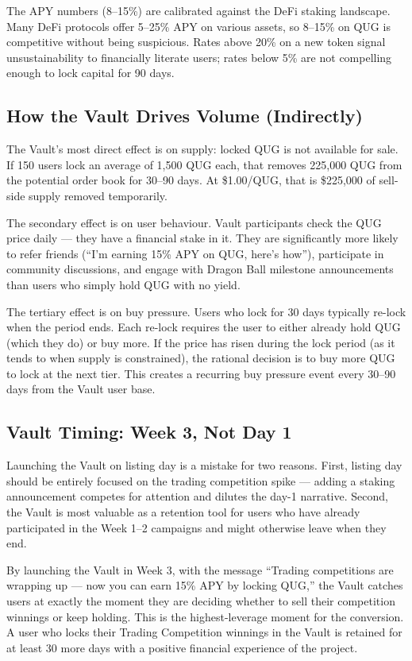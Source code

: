\documentclass[11pt,a4paper]{article}
\begin{document}
The APY numbers (8--15\%) are calibrated against the DeFi staking landscape. Many DeFi protocols offer 5--25\% APY on various assets, so 8--15\% on QUG is competitive without being suspicious. Rates above 20\% on a new token signal unsustainability to financially literate users; rates below 5\% are not compelling enough to lock capital for 90 days.

\subsection{How the Vault Drives Volume (Indirectly)}

The Vault's most direct effect is on supply: locked QUG is not available for sale. If 150 users lock an average of 1,500 QUG each, that removes 225,000 QUG from the potential order book for 30--90 days. At \$1.00/QUG, that is \$225,000 of sell-side supply removed temporarily.

The secondary effect is on user behaviour. Vault participants check the QUG price daily — they have a financial stake in it. They are significantly more likely to refer friends (``I'm earning 15\% APY on QUG, here's how''), participate in community discussions, and engage with Dragon Ball milestone announcements than users who simply hold QUG with no yield.

The tertiary effect is on buy pressure. Users who lock for 30 days typically re-lock when the period ends. Each re-lock requires the user to either already hold QUG (which they do) or buy more. If the price has risen during the lock period (as it tends to when supply is constrained), the rational decision is to buy more QUG to lock at the next tier. This creates a recurring buy pressure event every 30--90 days from the Vault user base.

\subsection{Vault Timing: Week 3, Not Day 1}

Launching the Vault on listing day is a mistake for two reasons. First, listing day should be entirely focused on the trading competition spike — adding a staking announcement competes for attention and dilutes the day-1 narrative. Second, the Vault is most valuable as a retention tool for users who have already participated in the Week 1--2 campaigns and might otherwise leave when they end.

By launching the Vault in Week 3, with the message ``Trading competitions are wrapping up — now you can earn 15\% APY by locking QUG,'' the Vault catches users at exactly the moment they are deciding whether to sell their competition winnings or keep holding. This is the highest-leverage moment for the conversion. A user who locks their Trading Competition winnings in the Vault is retained for at least 30 more days with a positive financial experience of the project.
\end{document}
